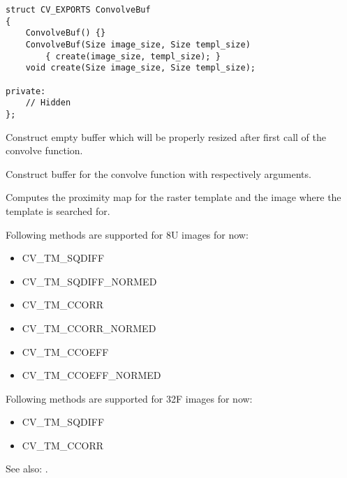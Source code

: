 \begin{lstlisting}
struct CV_EXPORTS ConvolveBuf
{
    ConvolveBuf() {}
    ConvolveBuf(Size image_size, Size templ_size) 
        { create(image_size, templ_size); }
    void create(Size image_size, Size templ_size);

private:
    // Hidden
};
\end{lstlisting}



Construct empty buffer which will be properly resized after first call of the convolve function.

Construct buffer for the convolve function with respectively arguments.


Computes the proximity map for the raster template and the image where the template is searched for.


\begin{description}
\end{description}
Following methods are supported for 8U images for now:
\begin{itemize}
\item CV\_TM\_SQDIFF \item CV\_TM\_SQDIFF\_NORMED \item CV\_TM\_CCORR \item CV\_TM\_CCORR\_NORMED \item CV\_TM\_CCOEFF \item CV\_TM\_CCOEFF\_NORMED 
\end{itemize}
Following methods are supported for 32F images for now:
\begin{itemize}
\item CV\_TM\_SQDIFF \item CV\_TM\_CCORR
\end{itemize}

See also: . 